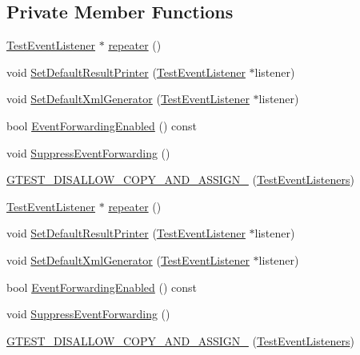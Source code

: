 \subsection*{\-Private \-Member \-Functions}
\begin{DoxyCompactItemize}
\item 
\hyperlink{classtesting_1_1TestEventListener}{\-Test\-Event\-Listener} $\ast$ \hyperlink{classtesting_1_1TestEventListeners_af7cfacdf90b4ba59566c16d95ee5d6cc}{repeater} ()
\item 
void \hyperlink{classtesting_1_1TestEventListeners_a961d3f9b9dabd19bef6758afe2f6f814}{\-Set\-Default\-Result\-Printer} (\hyperlink{classtesting_1_1TestEventListener}{\-Test\-Event\-Listener} $\ast$listener)
\item 
void \hyperlink{classtesting_1_1TestEventListeners_a1e86c96ef131392c2b0bd302f16fb735}{\-Set\-Default\-Xml\-Generator} (\hyperlink{classtesting_1_1TestEventListener}{\-Test\-Event\-Listener} $\ast$listener)
\item 
bool \hyperlink{classtesting_1_1TestEventListeners_acb09364f2ea34dec945e6cf378b03ac8}{\-Event\-Forwarding\-Enabled} () const 
\item 
void \hyperlink{classtesting_1_1TestEventListeners_ac2231ac2b553e0f6a1cc2923224b9623}{\-Suppress\-Event\-Forwarding} ()
\item 
\hyperlink{classtesting_1_1TestEventListeners_aecf7d23aa2bc0314afc3ab35cfbbb50a}{\-G\-T\-E\-S\-T\-\_\-\-D\-I\-S\-A\-L\-L\-O\-W\-\_\-\-C\-O\-P\-Y\-\_\-\-A\-N\-D\-\_\-\-A\-S\-S\-I\-G\-N\-\_\-} (\hyperlink{classtesting_1_1TestEventListeners}{\-Test\-Event\-Listeners})
\item 
\hyperlink{classtesting_1_1TestEventListener}{\-Test\-Event\-Listener} $\ast$ \hyperlink{classtesting_1_1TestEventListeners_a748c8ce959b99c5cc25cac1f520d9ef2}{repeater} ()
\item 
void \hyperlink{classtesting_1_1TestEventListeners_a961d3f9b9dabd19bef6758afe2f6f814}{\-Set\-Default\-Result\-Printer} (\hyperlink{classtesting_1_1TestEventListener}{\-Test\-Event\-Listener} $\ast$listener)
\item 
void \hyperlink{classtesting_1_1TestEventListeners_a1e86c96ef131392c2b0bd302f16fb735}{\-Set\-Default\-Xml\-Generator} (\hyperlink{classtesting_1_1TestEventListener}{\-Test\-Event\-Listener} $\ast$listener)
\item 
bool \hyperlink{classtesting_1_1TestEventListeners_acb09364f2ea34dec945e6cf378b03ac8}{\-Event\-Forwarding\-Enabled} () const 
\item 
void \hyperlink{classtesting_1_1TestEventListeners_ac2231ac2b553e0f6a1cc2923224b9623}{\-Suppress\-Event\-Forwarding} ()
\item 
\hyperlink{classtesting_1_1TestEventListeners_aecf7d23aa2bc0314afc3ab35cfbbb50a}{\-G\-T\-E\-S\-T\-\_\-\-D\-I\-S\-A\-L\-L\-O\-W\-\_\-\-C\-O\-P\-Y\-\_\-\-A\-N\-D\-\_\-\-A\-S\-S\-I\-G\-N\-\_\-} (\hyperlink{classtesting_1_1TestEventListeners}{\-Test\-Event\-Listeners})
\end{DoxyCompactItemize}
